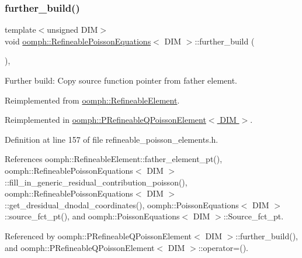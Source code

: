 \subsubsection{\texorpdfstring{further\+\_\+build()}{further\_build()}}
{\footnotesize\ttfamily template$<$unsigned D\+IM$>$ \\
void \hyperlink{classoomph_1_1RefineablePoissonEquations}{oomph\+::\+Refineable\+Poisson\+Equations}$<$ D\+IM $>$\+::further\+\_\+build (\begin{DoxyParamCaption}{ }\end{DoxyParamCaption})\hspace{0.3cm}{\ttfamily [inline]}, {\ttfamily [virtual]}}



Further build\+: Copy source function pointer from father element. 



Reimplemented from \hyperlink{classoomph_1_1RefineableElement_a26628ce36dfad028686adeb4694a9ef3}{oomph\+::\+Refineable\+Element}.



Reimplemented in \hyperlink{classoomph_1_1PRefineableQPoissonElement_a953633adeb9bc3875113d3672c7d525f}{oomph\+::\+P\+Refineable\+Q\+Poisson\+Element$<$ D\+I\+M $>$}.



Definition at line 157 of file refineable\+\_\+poisson\+\_\+elements.\+h.



References oomph\+::\+Refineable\+Element\+::father\+\_\+element\+\_\+pt(), oomph\+::\+Refineable\+Poisson\+Equations$<$ D\+I\+M $>$\+::fill\+\_\+in\+\_\+generic\+\_\+residual\+\_\+contribution\+\_\+poisson(), oomph\+::\+Refineable\+Poisson\+Equations$<$ D\+I\+M $>$\+::get\+\_\+dresidual\+\_\+dnodal\+\_\+coordinates(), oomph\+::\+Poisson\+Equations$<$ D\+I\+M $>$\+::source\+\_\+fct\+\_\+pt(), and oomph\+::\+Poisson\+Equations$<$ D\+I\+M $>$\+::\+Source\+\_\+fct\+\_\+pt.



Referenced by oomph\+::\+P\+Refineable\+Q\+Poisson\+Element$<$ D\+I\+M $>$\+::further\+\_\+build(), and oomph\+::\+P\+Refineable\+Q\+Poisson\+Element$<$ D\+I\+M $>$\+::operator=().

\mbox{\label{classoomph_1_1RefineablePoissonEquations_a1cb1cf52a2332954f69199c7e0c219b4}} 

